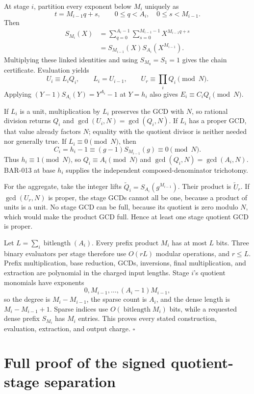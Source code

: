 \documentclass[11pt]{article}
\begin{document}
At stage \(i\), partition every exponent below \(M_i\) uniquely as
\[
t=M_{i-1}q+s,\qquad 0\le q<A_i,\quad 0\le s<M_{i-1}.
\]
Then
\[
\begin{aligned}
S_{M_i}(X)
 &=\sum_{q=0}^{A_i-1}\sum_{s=0}^{M_{i-1}-1}
   X^{M_{i-1}q+s}\\
 &=S_{M_{i-1}}(X)S_{A_i}(X^{M_{i-1}}).
\end{aligned}
\]
Multiplying these linked identities and using \(S_{M_0}=S_1=1\) gives the
chain certificate. Evaluation yields
\[
U_i\equiv L_iQ_i,\qquad L_i=U_{i-1},\qquad
U_r\equiv\prod_iQ_i\pmod N.
\]
Applying \((Y-1)S_{A_i}(Y)=Y^{A_i}-1\) at \(Y=h_i\) also gives
\(E_i\equiv C_iQ_i\pmod N\).

If \(L_i\) is a unit, multiplication by \(L_i\) preserves the GCD with \(N\),
so rational division returns \(Q_i\) and
\(\gcd(U_i,N)=\gcd(Q_i,N)\). If \(L_i\) has a proper GCD, that value already
factors \(N\); equality with the quotient divisor is neither needed nor
generally true. If \(L_i\equiv0\pmod N\), then
\[
C_i=h_i-1\equiv(g-1)S_{M_{i-1}}(g)\equiv0\pmod N.
\]
Thus \(h_i\equiv1\pmod N\), so \(Q_i\equiv A_i\pmod N\) and
\(\gcd(Q_i,N)=\gcd(A_i,N)\). BAR-013 at base \(h_i\) supplies the
independent composed-denominator trichotomy.

For the aggregate, take the integer lifts
\(\widetilde Q_i=S_{A_i}(g^{M_{i-1}})\). Their product is
\(\widetilde U_r\). If \(\gcd(U_r,N)\) is proper, the stage GCDs cannot all
be one, because a product of units is a unit. No stage GCD can be full,
because its quotient is zero modulo \(N\), which would make the product GCD
full. Hence at least one stage quotient GCD is proper.

Let \(L=\sum_i\operatorname{bitlength}(A_i)\). Every prefix product \(M_i\)
has at most \(L\) bits. Three binary evaluators per stage therefore use
\(O(rL)\) modular operations, and \(r\le L\). Prefix multiplication, base
reduction, GCDs, inversions, final multiplication, and extraction are
polynomial in the charged input lengths. Stage \(i\)'s quotient monomials
have exponents
\[
0,M_{i-1},\ldots,(A_i-1)M_{i-1},
\]
so the degree is \(M_i-M_{i-1}\), the sparse count is \(A_i\), and the dense
length is \(M_i-M_{i-1}+1\). Sparse indices use
\(O(\operatorname{bitlength}M_i)\) bits, while a requested dense prefix
\(S_{M_i}\) has \(M_i\) entries. This proves every stated construction,
evaluation, extraction, and output charge. \(\square\)

\section{Full proof of the signed quotient-stage separation}
\end{document}
